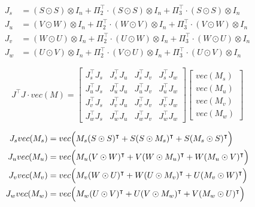 \documentclass{article}
\begin{document}
\begin{subequations}
    \begin{align}
    J_s & = (S\odot S) \otimes I_n + \Pi_2^\intercal\cdot (S\odot S) \otimes I_n + \Pi_3^\intercal\cdot (S\odot S) \otimes I_n\\
    J_u & = (V\odot W) \otimes I_n + \Pi_2^\intercal\cdot (W\odot V) \otimes I_n + \Pi_3^\intercal\cdot (V\odot W) \otimes I_n\\
    J_v & = (W\odot U) \otimes I_n + \Pi_2^\intercal\cdot (U\odot W) \otimes I_n + \Pi_3^\intercal\cdot (W\odot U) \otimes I_n\\
    J_w & = (U\odot V) \otimes I_n + \Pi_2^\intercal\cdot (V\odot U) \otimes I_n + \Pi_3^\intercal\cdot (U\odot V) \otimes I_n
    \end{align}
\end{subequations}

\begin{equation}
    J^\intercal J \cdot vec(M) = 
    \begin{bmatrix}
        J_s^\intercal J_s & J_s^\intercal J_u & J_s^\intercal J_v & J_s^\intercal J_w \\
        J_u^\intercal J_s & J_u^\intercal J_u & J_u^\intercal J_v & J_u^\intercal J_w \\
        J_v^\intercal J_s & J_v^\intercal J_u & J_v^\intercal J_v & J_v^\intercal J_w \\
        J_w^\intercal J_s & J_w^\intercal J_u & J_w^\intercal J_v & J_w^\intercal J_w
    \end{bmatrix}
    \begin{bmatrix}
        vec(M_s) \\
        vec(M_u) \\
        vec(M_v) \\
        vec(M_w)
    \end{bmatrix}
\end{equation}

\begin{subequations}
    \begin{align}
        J_s vec(M_s) & = vec\Bigl(M_s(S\odot S)^\intercal + S(S\odot M_s)^\intercal + S(M_s\odot S)^\intercal\Bigl) \\
        J_u vec(M_u) & = vec\Bigl(M_u(V\odot W)^\intercal + V(W\odot M_u)^\intercal + W(M_u\odot V)^\intercal\Bigl) \\
        J_v vec(M_v) & = vec\Bigl(M_v(W\odot U)^\intercal + W(U\odot M_v)^\intercal + U(M_v\odot W)^\intercal\Bigl) \\
        J_w vec(M_w) & = vec\Bigl(M_w(U\odot V)^\intercal + U(V\odot M_w)^\intercal + V(M_w\odot U)^\intercal\Bigl)
    \end{align}
\end{subequations}
\end{document}
